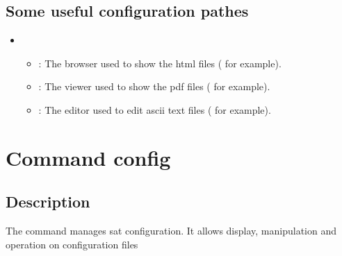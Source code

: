 \documentclass[a4paper,10pt,english]{sphinxmanual}
\begin{document}
\subsection{Some useful configuration pathes}
\label{\detokenize{commands/doc:some-useful-configuration-pathes}}\begin{itemize}
\item {} 
\begin{itemize}
\item {} 
 : The browser used to show the html files ( for example).

\item {} 
 : The viewer used to show the pdf files ( for example).

\item {} 
 : The editor used to edit ascii text files ( for example).

\end{itemize}

\end{itemize}

\clearpage


\section{Command config}
\label{\detokenize{commands/config:svn}}\label{\detokenize{commands/config:command-config}}\label{\detokenize{commands/config::doc}}

\subsection{Description}
\label{\detokenize{commands/config:description}}
The  command manages sat configuration.
It allows display, manipulation and operation on configuration files
\end{document}
